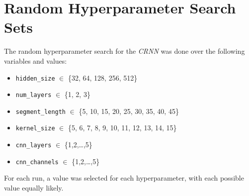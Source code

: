 \section{Random Hyperparameter Search Sets}\label{app:random_hyperparameter_search_sets}

The random hyperparameter search for the \emph{CRNN} was done over the following variables and values:
\begin{itemize}
    \item \texttt{hidden\_size} $\in$ \{32, 64, 128, 256, 512\}
    \item \texttt{num\_layers} $\in$ \{1, 2, 3\}
    \item \texttt{segment\_length} $\in$ \{5, 10, 15, 20, 25, 30, 35, 40, 45\}
    \item \texttt{kernel\_size} $\in$ \{5, 6, 7, 8, 9, 10, 11, 12, 13, 14, 15\}
    \item \texttt{cnn\_layers} $\in$ \{1,2,\ldots,5\}
    \item \texttt{cnn\_channels} $\in$ \{1,2,\ldots,5\}
\end{itemize}

For each run, a value was selected for each hyperparameter, with each possible value equally likely.



